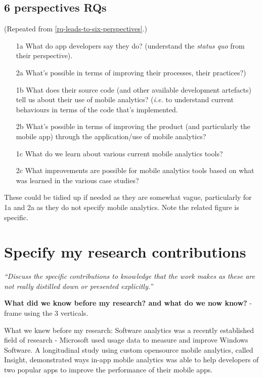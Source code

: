 \subsection{6 perspectives RQs}
(Repeated from \ref{rq-leads-to-six-perspectives}.)

\begin{kaobox}[frametitle=The six perspectives from Chapter 1]
\begin{enumerate}
    \item [1a] What do app developers say they do? (understand the \emph{status quo} from their perspective).
    \item [2a] What's possible in terms of improving their processes, their practices?)
    \item [1b] What does their source code (and other available development artefacts) tell us about their use of mobile analytics? (\emph{i.e.} to understand current behaviours in terms of the code that's implemented.
    \item [2b] What's possible in terms of improving the product (and particularly the mobile app) through the application/use of mobile analytics?
    \item [1c] What do we learn about various current mobile analytics tools?
    \item [2c] What improvements are possible for mobile analytics tools based on what was learned in the various case studies?
\end{enumerate}    
\end{kaobox}

These could be tidied up if needed as they are somewhat vague, particularly 
 for 1a and 2a as they do not specify mobile analytics. Note the related figure is specific.


\section{Specify my research contributions}
\emph{``Discuss the specific contributions to knowledge that the work makes as these are not really distilled down or presented explicitly.''}

\textbf{What did we know before my research? and what do we now know?} - frame using the 3 verticals.

What we knew before my research:
Software analytics was a recently established field of research - Microsoft used usage data to measure and improve Windows Software. A longitudinal study using custom opensource mobile analytics, called Insight, demonstrated ways in-app mobile analytics was able to help developers of two popular apps to improve the performance of their mobile apps.

